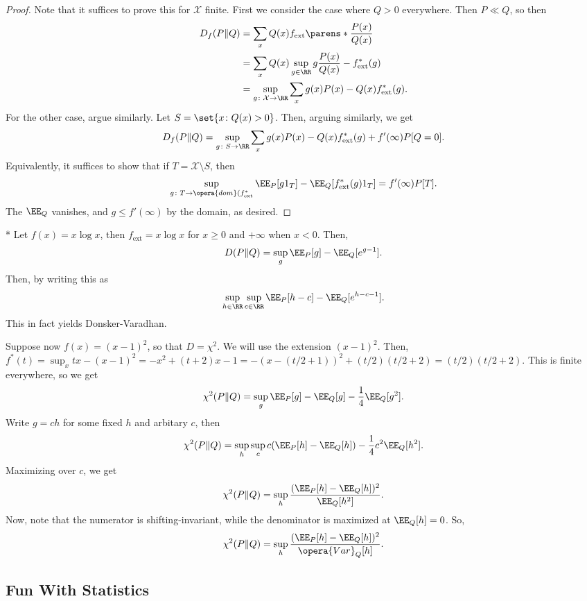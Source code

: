 \begin{proof}
	Note that it suffices to prove this for $\mathcal X$ finite. 
	First we consider the case where $Q > 0$ everywhere.  Then $P\ll Q$, so then \begin{align*}
		D_f(P\Vert Q) &= \sum_x Q(x) f_{\text{ext}} \parens*{\frac{P(x)}{Q(x)}} \\
		&= \sum_{x} Q(x) \sup_{g\in \RR} g\frac{P(x)}{Q(x)} - f_{\text{ext}}^*(g) \\
		&= \sup_{g\colon \mathcal X\to \RR} \sum_x g(x)P(x) - Q(x) f_{\text{ext}}^*(g).
	\end{align*}
	For the other case, argue similarly. Let $S = \set{x\colon Q(x) > 0}$. Then, arguing similarly, we get \[
		D_f(P\Vert Q) = \sup_{g\colon S\to \RR} \sum_x g(x)P(x) - Q(x) f_{\text{ext}}^*(g) + f'(\infty) P[Q=0].
	\]
	Equivalently, it suffices to show that if $T = \mathcal X \setminus S$, then \[
		\sup_{g\colon T\to \opera{dom}(f_{\textnormal{ext}}^*} \EE_P[g1_{T}] - \EE_Q[f_{\text{ext}}^*(g) 1_T] = f'(\infty) P[T].
	\]	
	The $\EE_Q$ vanishes, and $g\leq f'(\infty)$ by the domain, as desired.
\end{proof}

\begin{exm}*
	Let $f(x) = x\log x$, then $f_{\text{ext}} = x\log x$ for $x \geq 0$ and $+\infty$ when $x<0$. Then, \[
		D(P\Vert Q) = \sup_g \EE_P[g] - \EE_Q[e^{g-1}]. 
	\]	
	Then, by writing this as \[
		\sup_{h\in \RR} \sup_{c\in \RR} \EE_P[h-c] - \EE_Q[e^{h-c-1}].
	\]
	This in fact yields Donsker-Varadhan.
\end{exm}

\begin{exm}
	Suppose now $f(x) = (x-1)^2$, so that $D = \chi^2$. We will use the extension $(x-1)^2$.
	Then, $f^*(t) = \sup_x tx - (x-1)^2 = -x^2 + (t+2)x - 1 = -(x-(t/2+1))^2 + (t/2)(t/2+2) = (t/2)(t/2+2)$. This is finite everywhere, so we get \[
		\chi^2(P\Vert Q) = \sup_g \EE_P[g] - \EE_Q[g] - \frac 14 \EE_Q[g^2].
	\]
	Write $g = ch$ for some fixed $h$ and arbitary $c$, then \[
		\chi^2(P\Vert Q) = \sup_h \sup_c c(\EE_P[h] - \EE_Q[h]) - \frac 14 c^2 \EE_Q[h^2].
	\]
	Maximizing over $c$, we get \[
		\chi^2(P\Vert Q) = \sup_h \frac{(\EE_P [h] - \EE_Q[h])^2}{\EE_Q[h^2]}.
	\]
	Now, note that the numerator is shifting-invariant, while the denominator is maximized at $\EE_Q[h] = 0$. So, \[
		\chi^2(P\Vert Q) = \sup_h \frac{(\EE_P[h] - \EE_Q[h])^2}{\opera{Var}_Q[h]}.
	\]
\end{exm}

\subsection{Fun With Statistics}

